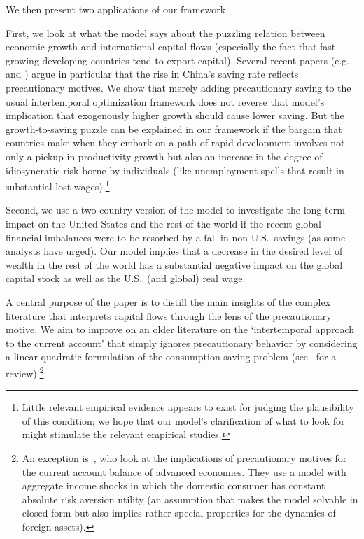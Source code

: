 \documentclass[titlepage,abstract,letterpaper]{econtex}
\begin{document}
We then present two applications of our framework. 

First, we look at what the model says about the puzzling relation
between economic growth and international capital flows (especially
the fact that fast-growing developing countries tend to export
capital).  Several recent papers (e.g., \cite{clpChinaSaving} and
\cite{wenChinaSaving}) argue in particular that the rise in China's
saving rate reflects precautionary motives.  We show that merely
adding precautionary saving to the usual intertemporal optimization
framework does not reverse that model's implication that exogenously
higher growth should cause lower saving.  But the growth-to-saving
puzzle can be explained in our framework if the bargain that countries
make when they embark on a path of rapid development involves not only
a pickup in productivity growth but also an increase in the degree of
idiosyncratic risk borne by individuals (like unemployment spells that
result in substantial lost wages).\footnote{Little relevant empirical
evidence appears to exist for judging the plausibility of this condition;
we hope that our model's clarification of what to look for might stimulate 
the relevant empirical studies.}

Second, we use a two-country version of the model to investigate the
long-term impact on the United States and the rest of the world if the
recent global financial imbalances were to be resorbed by a fall in
non-U.S.\ savings (as some analysts have urged). Our model implies
that a decrease in the desired level of wealth in the rest of the
world has a substantial negative impact on the global capital stock as
well as the U.S.\ (and global) real wage.

A central purpose of the paper is to distill the main insights of the
complex literature that interprets capital flows through the lens of
the precautionary motive. We aim to
improve on an older literature on the `intertemporal approach to the
current account' that simply ignores precautionary behavior by
considering a linear-quadratic formulation of the consumption-saving
problem (see~\cite{orIntertemporal} for a review).\footnote{An exception
is~\cite{goJME}, who look at the implications of precautionary motives
for the current account balance of advanced economies. They use a
model with aggregate income shocks in which the domestic consumer has
constant absolute risk aversion utility (an assumption that makes the
model solvable in closed form but also implies rather special
properties for the dynamics of foreign assets).}
\end{document}
